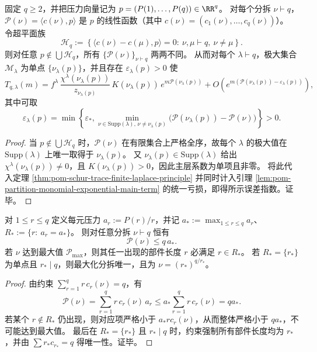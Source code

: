 \begin{theorem}\label{thm:pom-schur-pressure-fan-diagram}
固定 \(q\ge2\)，并把压力向量记为 \(p=(P(1),\dots,P(q))\in\RR^q\)。
对每个分拆 \(\nu\vdash q\)，\(\mathcal{P}(\nu)=\langle c(\nu),p\rangle\) 是 \(p\) 的线性函数（其中 \(c(\nu)=(c_1(\nu),\dots,c_q(\nu))\)）。
令超平面族
\[
\mathcal{H}_q
:=
\left\{\langle c(\nu)-c(\mu),p\rangle=0:\ \nu,\mu\vdash q,\ \nu\neq\mu\right\}.
\]
则对任意 \(p\notin\bigcup\mathcal{H}_q\)，所有 \(\{\mathcal{P}(\nu)\}_{\nu\vdash q}\) 两两不同。
从而对每个 \(\lambda\vdash q\)，极大集合 \(\mathcal{M}_\lambda\) 为单点 \(\{\nu_\lambda(p)\}\)，并且存在 \(\varepsilon_\lambda(p)>0\) 使
\[
T_{q,\lambda}(m)
=
f^\lambda\,\frac{\chi^\lambda(\nu_\lambda(p))}{z_{\nu_\lambda(p)}}\,K(\nu_\lambda(p))\,
e^{m\mathcal{P}(\nu_\lambda(p))}
+O\!\left(e^{m(\mathcal{P}(\nu_\lambda(p))-\varepsilon_\lambda(p))}\right),
\]
其中可取
\[
\varepsilon_\lambda(p)=\min\!\left\{
\varepsilon_*,
\min_{\nu\in\mathrm{Supp}(\lambda),\,\nu\neq\nu_\lambda(p)}\bigl(\mathcal{P}(\nu_\lambda(p))-\mathcal{P}(\nu)\bigr)
\right\}>0.
\]
\end{theorem}
\begin{proof}
当 \(p\notin\bigcup\mathcal{H}_q\) 时，\(\mathcal{P}(\nu)\) 在有限集合上严格全序，故每个 \(\lambda\) 的极大值在 \(\mathrm{Supp}(\lambda)\) 上唯一取得于 \(\nu_\lambda(p)\)。
又 \(\nu_\lambda(p)\in\mathrm{Supp}(\lambda)\) 给出 \(\chi^\lambda(\nu_\lambda(p))\neq 0\)，且 \(K(\nu_\lambda(p))>0\)，因此主层系数为单项且非零。
将此代入定理 \ref{thm:pom-schur-trace-finite-laplace-principle} 并同时计入引理 \ref{lem:pom-partition-monomial-exponential-main-term} 的统一亏损，即得所示误差指数。证毕。
\end{proof}

\begin{proposition}\label{prop:pom-partition-pressure-knapsack}
对 \(1\le r\le q\) 定义每元压力 \(a_r:=P(r)/r\)，并记 \(a_*:=\max_{1\le r\le q}a_r\)、\(R_*:=\{r:\ a_r=a_*\}\)。
则对任意分拆 \(\nu\vdash q\) 恒有
\[
\mathcal{P}(\nu)\le q\,a_*.
\]
若 \(\nu\) 达到最大值 \(\mathcal{P}_{\max}\)，则其任一出现的部件长度 \(r\) 必满足 \(r\in R_*\)。
若 \(R_*=\{r_*\}\) 为单点且 \(r_*\mid q\)，则最大化分拆唯一，且为 \(\nu=(r_*)^{q/r_*}\)。
\end{proposition}
\begin{proof}
由约束 \(\sum_{r=1}^{q} r\,c_r(\nu)=q\)，有
\[
\mathcal{P}(\nu)=\sum_{r=1}^{q} r\,c_r(\nu)\,a_r\le a_*\sum_{r=1}^{q} r\,c_r(\nu)=q a_*.
\]
若某个 \(r\notin R_*\) 仍出现，则对应项严格小于 \(a_* r c_r(\nu)\)，从而整体严格小于 \(q a_*\)，不可能达到最大值。
最后在 \(R_*=\{r_*\}\) 且 \(r_*\mid q\) 时，约束强制所有部件长度均为 \(r_*\)，并由 \(\sum r_*c_{r_*}=q\) 得唯一性。证毕。
\end{proof}

